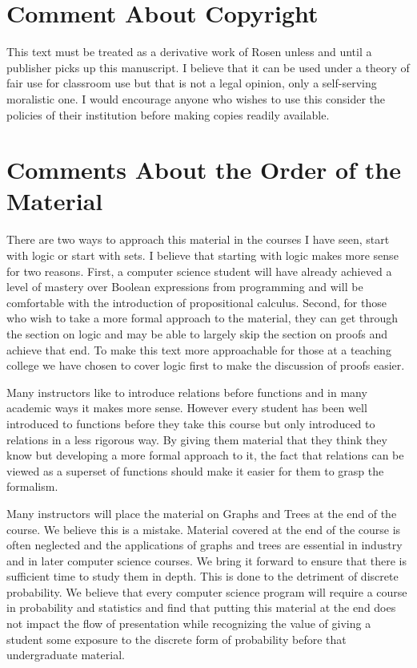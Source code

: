 \section*{Comment About Copyright}
This text must be treated as a derivative work of Rosen unless and until a publisher picks up this manuscript. I believe that it can be used under a theory of fair use for classroom use but that is not a legal opinion, only a self-serving moralistic one. I would encourage anyone who wishes to use this consider the policies of their institution before making copies readily available. 

\section*{Comments About the Order of the Material}
There are two ways to approach this material in the courses I have seen, start with logic or start with sets. I believe that starting with logic makes more sense for two reasons. First, a computer science student will have already achieved a level of mastery over Boolean expressions from programming and will be comfortable with the introduction of propositional calculus. Second, for those who wish to take a more formal approach to the material, they can get through the section on logic and may be able to largely skip the section on proofs and achieve that end. To make this text more approachable for those at a teaching college we have chosen to cover logic first to make the discussion of proofs easier.

Many instructors like to introduce relations before functions and in many academic ways it makes more sense. However every student has been well introduced to functions before they take this course but only introduced to relations in a less rigorous way. By giving them material that they think they know but developing a more formal approach to it, the fact that relations can be viewed as a superset of functions should make it easier for them to grasp the formalism. 

Many instructors will place the material on Graphs and Trees at the end of the course. We believe this is a mistake. Material covered at the end of the course is often neglected and the applications of graphs and trees are essential in industry and in later computer science courses. We bring it forward to ensure that there is sufficient time to study them in depth. This is done to the detriment of discrete probability. We believe that every computer science program will require a course in probability and statistics and find that putting this material at the end does not impact the flow of presentation while recognizing the value of giving a student some exposure to the discrete form of probability before that undergraduate material. 

